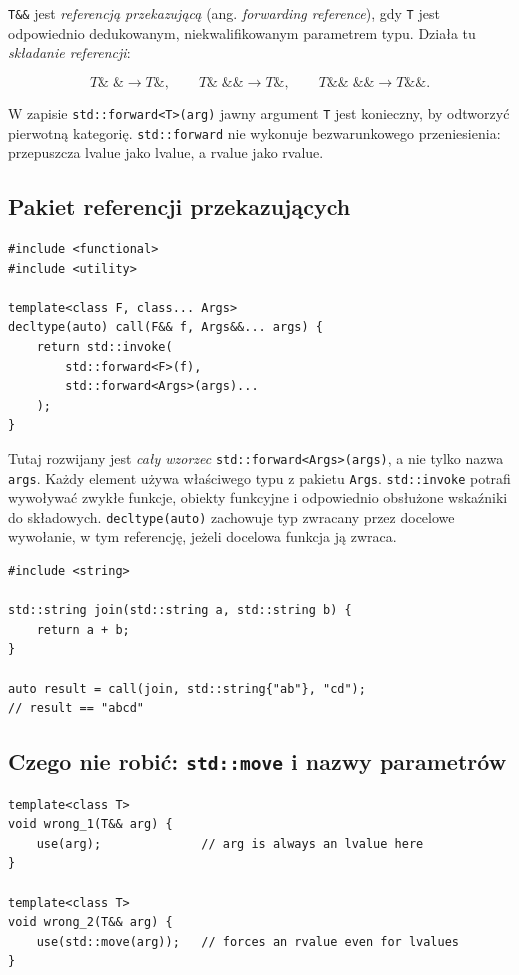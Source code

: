 \texttt{T\&\&} jest \emph{referencją przekazującą}
(ang. \emph{forwarding reference}), gdy \texttt{T} jest
odpowiednio dedukowanym, niekwalifikowanym parametrem typu.
Działa tu \emph{składanie referencji}:

\[
T\&\;\& \longrightarrow T\&,
\qquad
T\&\;\&\& \longrightarrow T\&,
\qquad
T\&\&\;\&\& \longrightarrow T\&\&.
\]

W zapisie \texttt{std::forward<T>(arg)} jawny argument
\texttt{T} jest konieczny, by odtworzyć pierwotną kategorię.
\texttt{std::forward} nie wykonuje bezwarunkowego przeniesienia:
przepuszcza lvalue jako lvalue, a rvalue jako rvalue.

\subsection{Pakiet referencji przekazujących}

\begin{lstlisting}
#include <functional>
#include <utility>

template<class F, class... Args>
decltype(auto) call(F&& f, Args&&... args) {
    return std::invoke(
        std::forward<F>(f),
        std::forward<Args>(args)...
    );
}
\end{lstlisting}

Tutaj rozwijany jest \emph{cały wzorzec}
\texttt{std::forward<Args>(args)}, a nie tylko nazwa
\texttt{args}. Każdy element używa właściwego typu z pakietu
\texttt{Args}.
\texttt{std::invoke} potrafi wywoływać zwykłe funkcje,
obiekty funkcyjne i odpowiednio obsłużone wskaźniki do składowych.
\texttt{decltype(auto)} zachowuje typ zwracany przez docelowe
wywołanie, w tym referencję, jeżeli docelowa funkcja ją zwraca.

\begin{lstlisting}
#include <string>

std::string join(std::string a, std::string b) {
    return a + b;
}

auto result = call(join, std::string{"ab"}, "cd");
// result == "abcd"
\end{lstlisting}

\subsection{Czego nie robić: \texttt{std::move} i nazwy parametrów}

\begin{lstlisting}
template<class T>
void wrong_1(T&& arg) {
    use(arg);              // arg is always an lvalue here
}

template<class T>
void wrong_2(T&& arg) {
    use(std::move(arg));   // forces an rvalue even for lvalues
}
\end{lstlisting}

